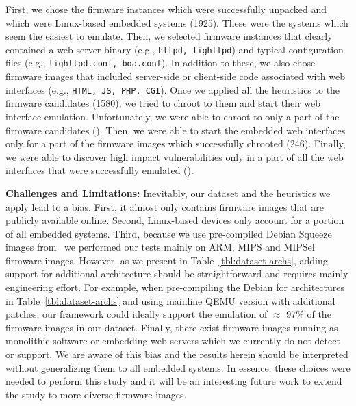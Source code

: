 \documentclass[conference]{./templates/ndss/IEEEtran}
\newcounter{t0d0_counter}
\newcounter{pr00f_counter}
\newcommand{\countfirmwarewebTP}{1925}
\newcommand{\countfirmwareforemulation}{1580}
\newcommand{\CountFirmwareEmulatedWebServerStarted}{246}
\begin{document}
    First, we chose the firmware instances which were successfully unpacked 
and which were Linux-based embedded systems (\countfirmwarewebTP{}). 
These were the systems which seem the easiest to emulate.
Then, we selected firmware instances that clearly contained a web server binary
(e.g., \texttt{httpd, lighttpd}) and typical configuration files 
(e.g., \texttt{lighttpd.conf, boa.conf}). In addition to these, we also 
chose firmware images that included server-side or client-side code associated with 
web interfaces (e.g., \texttt{HTML, JS, PHP, CGI}). Once we applied all the heuristics to the firmware candidates 
(\countfirmwareforemulation{}), we tried to chroot to them and start 
their web interface emulation. 
    Unfortunately, we were able to chroot to only a part of the firmware 
candidates (\CountFirmwareEmulatedOK{}). Then, we were able to start the 
embedded web interfaces only for a part of the firmware images which 
successfully chrooted (\CountFirmwareEmulatedWebServerStarted{}). Finally, 
we were able to discover high impact vulnerabilities only in a part of 
all the web interfaces that were successfully emulated (\countfirmwarestotal{}). 



\noindent \textbf{Challenges and Limitations:}
Inevitably, our dataset and the heuristics we apply lead to a bias. 
    First, it almost only contains firmware images that are publicly available 
online. Second, Linux-based devices only account for a portion of all embedded systems. 
    Third, because we use pre-compiled Debian Squeeze images from~\cite{aurel32qemu} 
we performed our tests mainly on ARM, MIPS and MIPSel firmware images. 
However, as we present in Table~\ref{tbl:dataset-archs}, adding support 
for additional architecture should be straightforward and requires mainly 
engineering effort. For example, when pre-compiling the Debian for 
architectures in Table~\ref{tbl:dataset-archs} and using mainline QEMU 
version with additional patches, our framework could ideally support the 
emulation of $\approx$ 97\% of the firmware images in our dataset. 
    Finally, there exist firmware images 
running as monolithic software or embedding web servers which we currently
do not detect or support. 
We are aware of this bias and the results herein should be
interpreted without generalizing them to all embedded systems. In essence, these choices were needed to perform this study and it will be
an interesting future work to extend the study to more diverse
firmware images.
\end{document}
